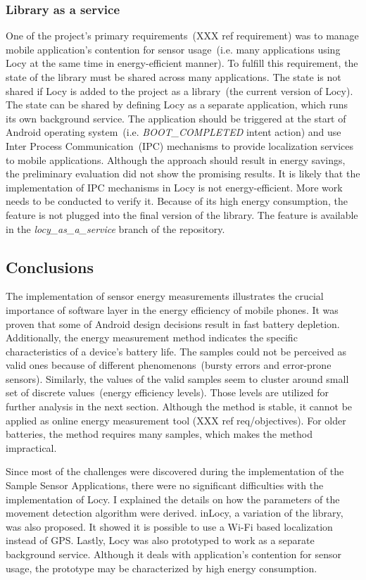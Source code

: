 \subsubsection{Library as a service}
\hspace{10pt} One of the project's primary requirements\ (XXX ref requirement) was to manage mobile application's contention for sensor usage\ (i.e. many applications using Locy at the same time in energy-efficient manner). To fulfill this requirement, the state of the library must be shared across many applications. The state is not shared if Locy is added to the project as a library\ (the current version of Locy). The state can be shared by defining Locy as a separate application, which runs its own background service. The application should be triggered at the start of Android operating system\ (i.e. \textit{BOOT\_COMPLETED} intent action) and use Inter Process Communication\ (IPC) mechanisms to provide localization services to mobile applications. Although the approach should result in energy savings, the preliminary evaluation did not show the promising results. It is likely that the implementation of IPC mechanisms in Locy is not energy-efficient. More work needs to be conducted to verify it. Because of its high energy consumption, the feature is not plugged into the final version of the library. The feature is available in the \textit{locy\_as\_a\_service} branch of the repository.

\subsection{Conclusions}
\hspace{10pt} The implementation of sensor energy measurements illustrates the crucial importance of software layer in the energy efficiency of mobile phones. It was proven that some of Android design decisions result in fast battery depletion. Additionally, the energy measurement method indicates the specific characteristics of a device's battery life. The samples could not be perceived as valid ones because of different phenomenons\ (bursty errors and error-prone sensors). Similarly, the values of the valid samples seem to cluster around small set of discrete values\ (energy efficiency levels). Those levels are utilized for further analysis in the next section. Although the method is stable, it cannot be applied as online energy measurement tool (XXX ref req/objectives). For older batteries, the method requires many samples, which makes the method impractical.

Since most of the challenges were discovered during the implementation of the Sample Sensor Applications, there were no significant difficulties with the implementation of Locy. I explained the details on how the parameters of the movement detection algorithm were derived. inLocy, a variation of the library, was also proposed. It showed it is possible to use a Wi-Fi based localization instead of GPS. Lastly, Locy was also prototyped to work as a separate background service. Although it deals with application's contention for sensor usage, the prototype may be characterized by high energy consumption. 